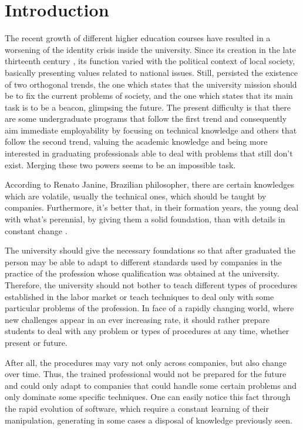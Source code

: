 \documentclass[conference]{IEEEtran}
\begin{document}
\section{Introduction}
	The recent growth of different higher education courses have resulted in a worsening of the identity crisis inside the university. Since its creation in the late thirteenth century \cite{oliveira:origem_universidades}, its function varied with the political context of local society, basically presenting values related to national issues. Still, persisted the existence of two orthogonal trends, the one which states that the university mission should be to fix the current problems of society, and the one which states that its main task is to be a beacon, glimpsing the future. The present difficulty is that there are some undergraduate programs that follow the first trend and consequently aim immediate employability by focusing on technical knowledge and others that follow the second trend, valuing the academic knowledge and being more interested in graduating professionals able to deal with problems that still don't exist. Merging these two powers seems to be an impossible task.
	
	According to Renato Janine, Brazilian philosopher, there are certain knowledges which are volatile, usually the technical ones, which should be taught by companies. Furthermore, it's better that, in their formation years, the young deal with what's perennial, by giving them a solid foundation, than with details in constant change \cite{ribeiro:universidade_vida_atual}.

	The university should give the necessary foundations so that after graduated the person may be able to adapt to different standards used by companies in the practice of the profession whose qualification was obtained at the university. Therefore, the university should not bother to teach different types of procedures established in the labor market or teach techniques to deal only with some particular problems of the profession. In face of a rapidly changing world, where new challenges appear in an ever increasing rate, it should rather prepare students to deal with any problem or types of procedures at any time, whether present or future.

	After all, the procedures may vary not only across companies, but also change over time. Thus, the trained professional would not be prepared for the future and could only adapt to companies that could handle some certain problems and only dominate some specific techniques. One can easily notice this fact through the rapid evolution of software, which require a constant learning of their manipulation, generating in some cases a disposal of knowledge previously seen.
\end{document}
